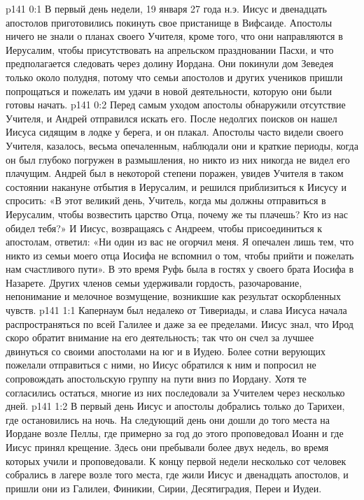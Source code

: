 \author{Комиссия срединников}
\vs p141 0:1 В первый день недели, 19 января 27 года н.э. Иисус и двенадцать апостолов приготовились покинуть свое пристанище в Вифсаиде. Апостолы ничего не знали о планах своего Учителя, кроме того, что они направляются в Иерусалим, чтобы присутствовать на апрельском праздновании Пасхи, и что предполагается следовать через долину Иордана. Они покинули дом Зеведея только около полудня, потому что семьи апостолов и других учеников пришли попрощаться и пожелать им удачи в новой деятельности, которую они были готовы начать.
\vs p141 0:2 Перед самым уходом апостолы обнаружили отсутствие Учителя, и Андрей отправился искать его. После недолгих поисков он нашел Иисуса сидящим в лодке у берега, и он плакал. Апостолы часто видели своего Учителя, казалось, весьма опечаленным, наблюдали они и краткие периоды, когда он был глубоко погружен в размышления, но никто из них никогда не видел его плачущим. Андрей был в некоторой степени поражен, увидев Учителя в таком состоянии накануне отбытия в Иерусалим, и решился приблизиться к Иисусу и спросить: «В этот великий день, Учитель, когда мы должны отправиться в Иерусалим, чтобы возвестить царство Отца, почему же ты плачешь? Кто из нас обидел тебя?» И Иисус, возвращаясь с Андреем, чтобы присоединиться к апостолам, ответил: «Ни один из вас не огорчил меня. Я опечален лишь тем, что никто из семьи моего отца Иосифа не вспомнил о том, чтобы прийти и пожелать нам счастливого пути». В это время Руфь была в гостях у своего брата Иосифа в Назарете. Других членов семьи удерживали гордость, разочарование, непонимание и мелочное возмущение, возникшие как результат оскорбленных чувств.
\vs p141 1:1 Капернаум был недалеко от Тивериады, и слава Иисуса начала распространяться по всей Галилее и даже за ее пределами. Иисус знал, что Ирод скоро обратит внимание на его деятельность; так что он счел за лучшее двинуться со своими апостолами на юг и в Иудею. Более сотни верующих пожелали отправиться с ними, но Иисус обратился к ним и попросил не сопровождать апостольскую группу на пути вниз по Иордану. Хотя те согласились остаться, многие из них последовали за Учителем через несколько дней.
\vs p141 1:2 В первый день Иисус и апостолы добрались только до Тарихеи, где остановились на ночь. На следующий день они дошли до того места на Иордане возле Пеллы, где примерно за год до этого проповедовал Иоанн и где Иисус принял крещение. Здесь они пребывали более двух недель, во время которых учили и проповедовали. К концу первой недели несколько сот человек собрались в лагере возле того места, где жили Иисус и двенадцать апостолов, и пришли они из Галилеи, Финикии, Сирии, Десятиградия, Переи и Иудеи.
